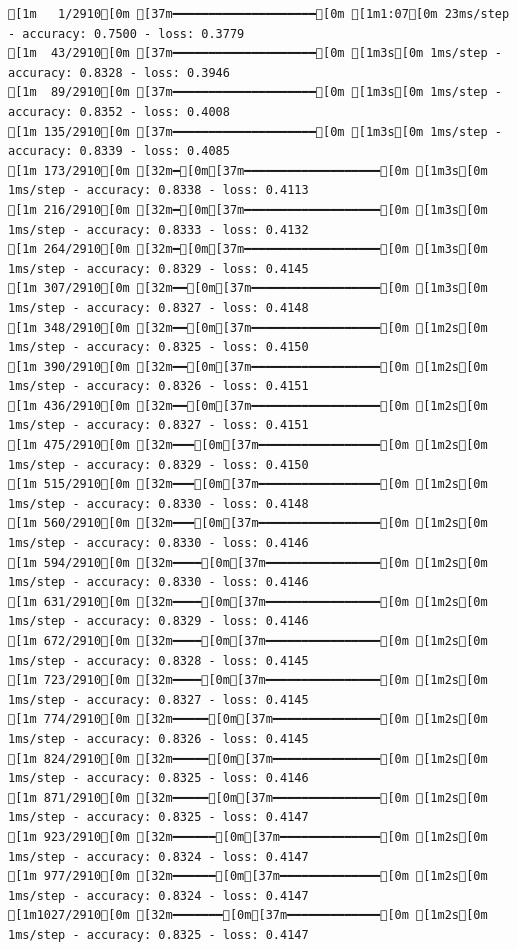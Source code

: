 \documentclass[
  letterpaper,
  DIV=11,
  numbers=noendperiod]{scrartcl}
\begin{document}
\begin{verbatim}
[1m   1/2910[0m [37m━━━━━━━━━━━━━━━━━━━━[0m [1m1:07[0m 23ms/step - accuracy: 0.7500 - loss: 0.3779
[1m  43/2910[0m [37m━━━━━━━━━━━━━━━━━━━━[0m [1m3s[0m 1ms/step - accuracy: 0.8328 - loss: 0.3946   
[1m  89/2910[0m [37m━━━━━━━━━━━━━━━━━━━━[0m [1m3s[0m 1ms/step - accuracy: 0.8352 - loss: 0.4008
[1m 135/2910[0m [37m━━━━━━━━━━━━━━━━━━━━[0m [1m3s[0m 1ms/step - accuracy: 0.8339 - loss: 0.4085
[1m 173/2910[0m [32m━[0m[37m━━━━━━━━━━━━━━━━━━━[0m [1m3s[0m 1ms/step - accuracy: 0.8338 - loss: 0.4113
[1m 216/2910[0m [32m━[0m[37m━━━━━━━━━━━━━━━━━━━[0m [1m3s[0m 1ms/step - accuracy: 0.8333 - loss: 0.4132
[1m 264/2910[0m [32m━[0m[37m━━━━━━━━━━━━━━━━━━━[0m [1m3s[0m 1ms/step - accuracy: 0.8329 - loss: 0.4145
[1m 307/2910[0m [32m━━[0m[37m━━━━━━━━━━━━━━━━━━[0m [1m3s[0m 1ms/step - accuracy: 0.8327 - loss: 0.4148
[1m 348/2910[0m [32m━━[0m[37m━━━━━━━━━━━━━━━━━━[0m [1m2s[0m 1ms/step - accuracy: 0.8325 - loss: 0.4150
[1m 390/2910[0m [32m━━[0m[37m━━━━━━━━━━━━━━━━━━[0m [1m2s[0m 1ms/step - accuracy: 0.8326 - loss: 0.4151
[1m 436/2910[0m [32m━━[0m[37m━━━━━━━━━━━━━━━━━━[0m [1m2s[0m 1ms/step - accuracy: 0.8327 - loss: 0.4151
[1m 475/2910[0m [32m━━━[0m[37m━━━━━━━━━━━━━━━━━[0m [1m2s[0m 1ms/step - accuracy: 0.8329 - loss: 0.4150
[1m 515/2910[0m [32m━━━[0m[37m━━━━━━━━━━━━━━━━━[0m [1m2s[0m 1ms/step - accuracy: 0.8330 - loss: 0.4148
[1m 560/2910[0m [32m━━━[0m[37m━━━━━━━━━━━━━━━━━[0m [1m2s[0m 1ms/step - accuracy: 0.8330 - loss: 0.4146
[1m 594/2910[0m [32m━━━━[0m[37m━━━━━━━━━━━━━━━━[0m [1m2s[0m 1ms/step - accuracy: 0.8330 - loss: 0.4146
[1m 631/2910[0m [32m━━━━[0m[37m━━━━━━━━━━━━━━━━[0m [1m2s[0m 1ms/step - accuracy: 0.8329 - loss: 0.4146
[1m 672/2910[0m [32m━━━━[0m[37m━━━━━━━━━━━━━━━━[0m [1m2s[0m 1ms/step - accuracy: 0.8328 - loss: 0.4145
[1m 723/2910[0m [32m━━━━[0m[37m━━━━━━━━━━━━━━━━[0m [1m2s[0m 1ms/step - accuracy: 0.8327 - loss: 0.4145
[1m 774/2910[0m [32m━━━━━[0m[37m━━━━━━━━━━━━━━━[0m [1m2s[0m 1ms/step - accuracy: 0.8326 - loss: 0.4145
[1m 824/2910[0m [32m━━━━━[0m[37m━━━━━━━━━━━━━━━[0m [1m2s[0m 1ms/step - accuracy: 0.8325 - loss: 0.4146
[1m 871/2910[0m [32m━━━━━[0m[37m━━━━━━━━━━━━━━━[0m [1m2s[0m 1ms/step - accuracy: 0.8325 - loss: 0.4147
[1m 923/2910[0m [32m━━━━━━[0m[37m━━━━━━━━━━━━━━[0m [1m2s[0m 1ms/step - accuracy: 0.8324 - loss: 0.4147
[1m 977/2910[0m [32m━━━━━━[0m[37m━━━━━━━━━━━━━━[0m [1m2s[0m 1ms/step - accuracy: 0.8324 - loss: 0.4147
[1m1027/2910[0m [32m━━━━━━━[0m[37m━━━━━━━━━━━━━[0m [1m2s[0m 1ms/step - accuracy: 0.8325 - loss: 0.4147

\end{verbatim}
\end{document}
